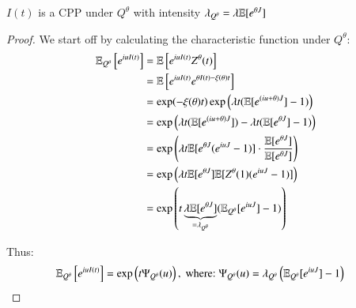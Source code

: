 \newpage 

\begin{proposition}
$I(t)$ is a CPP under $Q^{\theta}$ with intensity $\lambda_{Q^{\theta}} = \lambda \mathbb{E}[e^{\theta J}]$
\end{proposition} 

\begin{proof}
We start off by calculating the characteristic function under $Q^{\theta}$: 
\begin{align*}
\mathbb{E}_{Q^{\theta}}\left[
e^{iuI(t)} 
\right]
&= 
\mathbb{E}\left[
e^{iuI(t)}Z^{\theta}(t)
\right] \\ 
&= 
\mathbb{E}\left[
e^{iuI(t)}e^{\theta I(t) - \xi(\theta)t}
\right] \\ 
&= 
\exp(-\xi(\theta)t)\exp\left(
\lambda t(\mathbb{E}[e^{(iu+\theta)J}]-1)
\right) \\ 
&= 
\exp\left(
\lambda t(\mathbb{E}[e^{(iu+\theta)J}]) -
\lambda t(\mathbb{E}[e^{\theta J}]-1)
\right) \\ 
&= 
\exp\left(
\lambda t\mathbb{E}[e^{\theta J}(e^{iuJ}-1)]\cdot \frac{\mathbb{E}[e^{\theta J}]}{\mathbb{E}[e^{\theta J}]}
\right) \\ 
&= 
\exp\left(
\lambda t \mathbb{E}[e^{\theta J}]\mathbb{E}[Z^{\theta}(1)(e^{iuJ}-1)]
\right) \\ 
&= 
\exp\left(
t \underbrace{\lambda \mathbb{E}[e^{\theta J}]}_{= \lambda_{Q^{\theta}}}
(\mathbb{E}_{Q^{\theta}}[e^{iuJ}]-1)
\right)
\end{align*}

Thus: 
\begin{align*}
\mathbb{E}_{Q^{\theta}}\left[
e^{iuI(t)}
\right]
&= \exp\left(
t \Psi_{Q^{\theta}}(u)
\right), \;\text{where:}\;
\Psi_{Q^{\theta}}(u) = \lambda_{Q^{\theta}}\left(
\mathbb{E}_{Q^{\theta}}[e^{iuJ}]-1
\right)
\end{align*}
\end{proof}













